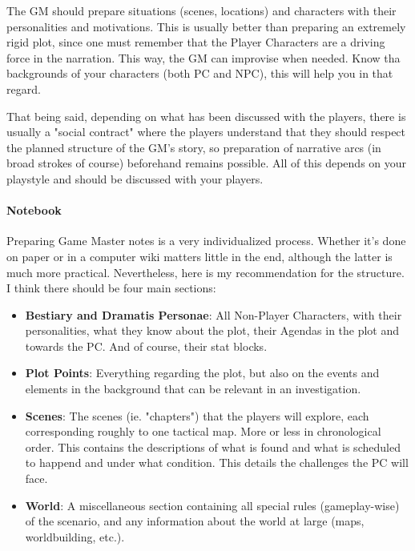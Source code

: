 The GM should prepare situations (scenes, locations) and characters with their personalities and motivations. This is usually better than preparing an extremely rigid plot, since one must remember that the Player Characters are a driving force in the narration. This way, the GM can improvise when needed. Know tha backgrounds of your characters (both PC and NPC), this will help you in that regard.

That being said, depending on what has been discussed with the players, there is usually a "social contract" where the players understand that they should respect the planned structure of the GM's story, so preparation of narrative arcs (in broad strokes of course) beforehand remains possible. All of this depends on your playstyle and should be discussed with your players.


\paragraph{Notebook}

Preparing Game Master notes is a very individualized process. Whether it's done on paper or in a computer wiki matters little in the end, although the latter is much more practical. Nevertheless, here is my recommendation for the structure. I think there should be four main sections:

\begin{itemize}
    \item \textbf{Bestiary and Dramatis Personae}: All Non-Player Characters, with their personalities, what they know about the plot, their Agendas in the plot and towards the PC. And of course, their stat blocks. 
    \item \textbf{Plot Points}: Everything regarding the plot, but also on the events and elements in the background that can be relevant in an investigation.
    \item \textbf{Scenes}: The scenes (ie. "chapters") that the players will explore, each corresponding roughly to one tactical map. More or less in chronological order. This contains the descriptions of what is found and what is scheduled to happend and under what condition. This details the challenges the PC will face.
    \item \textbf{World}: A miscellaneous section containing all special rules (gameplay-wise) of the scenario, and any information about the world at large (maps, worldbuilding, etc.).
\end{itemize}



